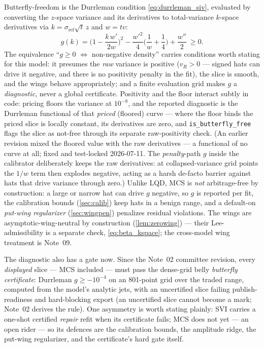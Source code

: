 \documentclass[11pt]{article}
\begin{document}
Butterfly-freedom is the Durrleman condition \eqref{eq:durrleman_siv}, evaluated
by converting the $z$-space variance and its derivatives to total-variance
$k$-space derivatives via $k=\sigma_{\text{ref}}\sqrt t\,z$ and $w=tv$:
\begin{equation}
g(k)=\Big(1-\frac{k\,w'}{2w}\Big)^2-\frac{w'^2}{4}\Big(\frac1w+\frac14\Big)+\frac{w''}{2}\ \ge0.
\label{eq:durrleman_siv}
\end{equation}
The equivalence ``$g\ge0$ $\iff$ non-negative density'' carries conditions
worth stating for this model: it presumes the \emph{raw} variance is positive
($v_R>0$ --- signed hats can drive it negative, and there is no positivity
penalty in the fit), the slice is smooth, and the wings behave appropriately;
and a finite evaluation grid makes $g$ a \emph{diagnostic}, never a global
certificate. Positivity and the floor interact subtly in code: pricing floors
the variance at $10^{-8}$, and the reported diagnostic is the Durrleman
functional of that \emph{priced} (floored) curve --- where the floor binds the
priced slice is locally constant, its derivatives are zero, and
\texttt{is\_butterfly\_free} flags the slice as not-free through its separate
raw-positivity check. (An earlier revision mixed the floored value with the
raw derivatives --- a functional of no curve at all; fixed and test-locked
2026-07-11. The \emph{penalty}-path $g$ inside the calibrator deliberately
keeps the raw derivatives: at collapsed-variance grid points the $1/w$ term
then explodes negative, acting as a harsh de-facto barrier against hats that
drive variance through zero.) Unlike LQD, MCS is
\emph{not} arbitrage-free by construction: a large or narrow hat can drive $g$
negative, so $g$ is reported per fit, the calibration bounds (\cref{sec:calib})
keep hats in a benign range, and a default-on \emph{put-wing regularizer}
(\cref{sec:wingpen}) penalizes residual violations. The wings are
asymptotic-wing-neutral by construction (\cref{lem:zerowing}) --- their
Lee-admissibility is a separate check, \eqref{eq:beta_kspace}; the cross-model
wing treatment is Note~09.

The diagnostic also has a gate now. Since the Note~02 committee revision,
every \emph{displayed} slice --- MCS included --- must pass the dense-grid
belly \emph{butterfly certificate}: Durrleman $g\ge-10^{-4}$ on an 801-point
grid over the traded range, computed from the model's analytic jets, with an
uncertified slice failing publish-readiness and hard-blocking export (an
uncertified slice cannot become a mark; Note~02 derives the rule). One
asymmetry is worth stating plainly: SVI carries a one-shot certified
\emph{repair} refit when its certificate fails; MCS does not yet --- an open
rider --- so its defences are the calibration bounds, the amplitude ridge,
the put-wing regularizer, and the certificate's hard gate itself.
\end{document}
